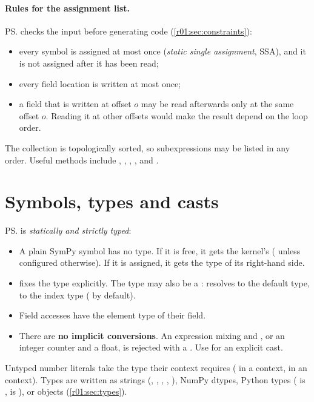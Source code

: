 \paragraph{Rules for the assignment list.}
\ps{} checks the input before generating code (\cref{r01:sec:constraints}):
\begin{itemize}
  \item every symbol is assigned at most once (\emph{static single assignment}, SSA), and
        it is not assigned after it has been read;
  \item every field location is written at most once;
  \item a field that is written at offset $o$ may be read afterwards only at the same
        offset $o$. Reading it at other offsets would make the result depend on the
        loop order.
\end{itemize}
The collection is topologically sorted, so subexpressions may be listed in any order.
Useful methods include , ,
, ,
 and .

\section{Symbols, types and casts}\label{r01:sec:types-frontend}

\ps{} is \emph{statically and strictly typed}:
\begin{itemize}
  \item A plain SymPy symbol has no type. If it is free, it gets the kernel's
         ( unless configured otherwise). If it is
        assigned, it gets the type of its right-hand side.
  \item {} fixes the type explicitly. The type may also
        be a :  resolves to the default type,
         to the index type ( by default).
  \item Field accesses have the element type of their field.
  \item There are \textbf{no implicit conversions}. An expression mixing
         and , or an integer counter and a float, is
        rejected with a . Use  for
        an explicit cast.
\end{itemize}
Untyped number literals take the type their context requires ( in a
 context,  in an  context). Types are written as strings
(, , , , ),
NumPy dtypes, Python types ( is ,  is
), or  objects (\cref{r01:sec:types}).

